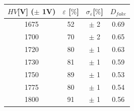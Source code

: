     \begin{tabular}{cccc}
    \toprule
    $HV$[V] ($\pm$ 1V) & $\varepsilon$ [$\%$] & $\sigma_{\varepsilon}$[$\%$] & $D_{fake}$ \\
    \midrule
    1675 & 52 & $\pm$ 2 & 0.69 \\
    1700 & 70 & $\pm$ 2 & 0.65 \\
    1720 & 80 & $\pm$ 1 & 0.63 \\
    1730 & 81 & $\pm$ 1 & 0.59 \\
    1750 & 89 & $\pm$ 1 & 0.53 \\
    1775 & 80 & $\pm$ 1 & 0.54 \\
    1800 & 91 & $\pm$ 1 & 0.56 \\
    \bottomrule
    \end{tabular}
